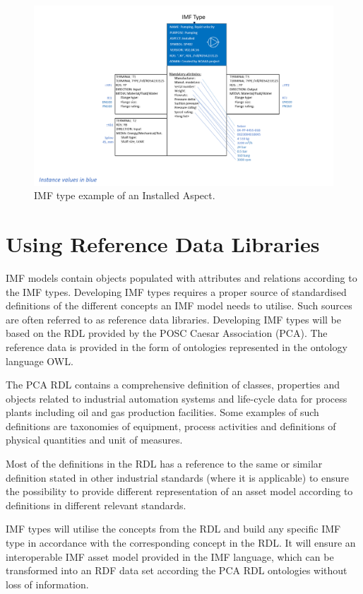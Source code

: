 \documentclass[../main.tex]{subfiles}
\begin{document}
\begin{figure}[htb]
  \centering
  \includegraphics[width=1\textwidth]{img/IMFmanual-img071.png}

  \caption{IMF type example of an Installed Aspect.}
  \label{fig:Figure 53}
\end{figure}

\section{Using Reference Data Libraries}
IMF models contain objects populated with attributes and relations according to the IMF
types. Developing IMF types requires a proper source of standardised definitions of the different concepts an IMF
model needs to utilise. Such sources are often referred to as reference data libraries. Developing IMF types will
be based on the RDL provided by the POSC Caesar Association (PCA).
The reference data is provided in the form
of ontologies represented in the  ontology language OWL.

The PCA RDL contains a comprehensive definition of classes, properties and objects related to industrial
automation systems and life-cycle data for process plants including oil and gas production facilities. Some examples
of such definitions are taxonomies of equipment, process activities and definitions of physical quantities and unit of
measures.

Most of the definitions in the RDL has a reference to the same or similar definition stated in other industrial
standards (where it is applicable) to ensure the possibility to provide different representation of an asset model
according to definitions in different relevant standards.

IMF types will utilise the concepts from the RDL and build any specific IMF type in accordance with the corresponding
concept in the RDL. It will ensure an interoperable IMF asset model provided in the IMF language, which can be
transformed into an RDF data set according the PCA RDL ontologies without loss of information.
\end{document}
